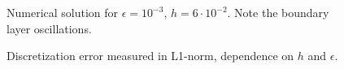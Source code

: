 \documentclass[a4paper,10pt]{article}
\begin{document}
\begin{figure}[!ht]
\centering
{}
\caption{Numerical solution for $\epsilon=10^{-3}$, $h=6\cdot10^{-2}$. Note the boundary
    layer oscillations.}
\end{figure}

\begin{figure}[!ht]
\centering
{}
\caption{Discretization error measured in L1-norm, dependence on $h$ and $\epsilon$.}
\end{figure}
\end{document}

